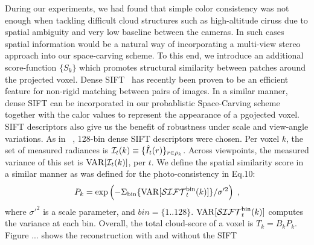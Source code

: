 \documentclass[runningheads]{llncs}
\begin{document}
During our experiments, we had found that simple color consistency was not enough when tackling difficult cloud structures such as high-altitude ciruss due to spatial ambiguity and very low baseline between the cameras. In such cases spatial information would be a natural way of incorporating a multi-view stereo approach into our space-carving scheme.
To this end, we introduce an additional score-function $\{S_k\}$ which promotes  structural similarity between patches around the projected voxel.
Dense SIFT~\cite{DenseSift2011} has recently been proven to be an efficient feature for non-rigid matching between pairs of images.
In a similar manner, dense SIFT can be incorporated in our probablistic Space-Carving scheme together with the calor values to represent the appearance of a pgojected voxel. SIFT descriptors also give us the benefit of robustness under scale and view-angle variations.
As in ~\cite{DenseSift2011}, 128-bin dense SIFT descriptors were chosen.
Per voxel $k$, the set of measured radiances is \mbox{${\cal I}_t(k)\equiv\{\hat I_t(r)\}_{r\in\rho_k}$}. Across viewpoints, the measured variance of this set is ${\rm VAR}[{\cal I}_t(k)]$, per $t$. We define the spatial similarity score in a similar manner as was defined for the photo-consistency in Eq.10:
\begin{equation}
 P_k= \exp\left(
         -\Sigma_{\rm bin}\{{\rm VAR}[{\cal SIFT}_t^{\rm bin}(k)]\}/\sigma'^2
         \right)
  \;,
 \label{eq:Dist}
\end{equation}
where $\sigma'^2$ is a scale parameter, and $bin=\{1..128\}$. ${\rm VAR}[{\cal SIFT}_t^{\rm bin}(k)]$ computes the variance at each bin. Overall, the total cloud-score of a voxel is $T_k=B_kP_k$.
Figure ... shows the reconstruction with and without the SIFT 








\end{document}

